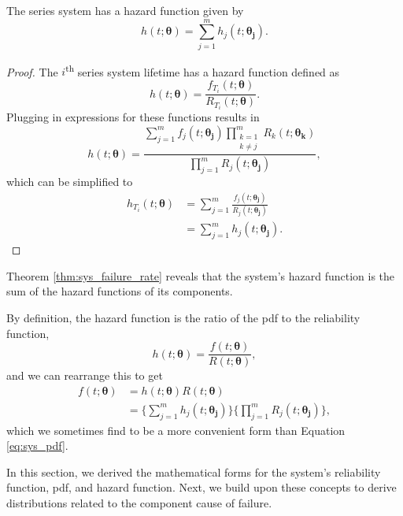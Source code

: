 \documentclass[
]{article}
\begin{document}
\begin{theorem}
\label{thm:sys_failure_rate}
The series system has a hazard function given by
\begin{equation}
\label{eq:sys_failure_rate}
  h(t;\boldsymbol{\theta}) = \sum_{j=1}^m h_j(t;\boldsymbol{\theta_j}).
\end{equation}
\end{theorem}
\begin{proof}
The $i$\textsuperscript{th} series system lifetime has a hazard function defined as
$$
  h(t;\boldsymbol{\theta}) = \frac{f_{T_i}(t;\boldsymbol{\theta})}{R_{T_i}(t;\boldsymbol{\theta})}.
$$
Plugging in expressions for these functions results in
$$
  h(t;\boldsymbol{\theta}) = \frac{\sum_{j=1}^m f_j(t;\boldsymbol{\theta_j})
    \prod_{\substack{k=1\\k \neq j}}^m R_k(t;\boldsymbol{\theta_k})}
      {\prod_{j=1}^m R_j(t;\boldsymbol{\theta_j})},
$$
which can be simplified to
\begin{align*}
h_{T_i}(t;\boldsymbol{\theta})
    &= \sum_{j=1}^m \frac{f_j(t;\boldsymbol{\theta_j})}{R_j(t;\boldsymbol{\theta_j})}\\
    &= \sum_{j=1}^m h_j(t;\boldsymbol{\theta_j}).
\end{align*}
\end{proof}

Theorem \ref{thm:sys_failure_rate} reveals that the system's hazard
function is the sum of the hazard functions of its components.

By definition, the hazard function is the ratio of the pdf to the
reliability function, \[
h(t;\boldsymbol{\theta}) = \frac{f(t;\boldsymbol{\theta})}{R(t;\boldsymbol{\theta})},
\] and we can rearrange this to get \begin{equation}
\label{eq:sys_pdf_2}
\begin{split}
f(t;\boldsymbol{\theta}) &= h(t;\boldsymbol{\theta}) R(t;\boldsymbol{\theta})\\
              &= \biggl\{\sum_{j=1}^m h_j(t;\boldsymbol{\theta_j})\biggr\}
                 \biggl\{ \prod_{j=1}^m R_j(t;\boldsymbol{\theta_j}) \biggr\},
\end{split}
\end{equation} which we sometimes find to be a more convenient form than
Equation \eqref{eq:sys_pdf}.

In this section, we derived the mathematical forms for the system's
reliability function, pdf, and hazard function. Next, we build upon
these concepts to derive distributions related to the component cause of
failure.
\end{document}

